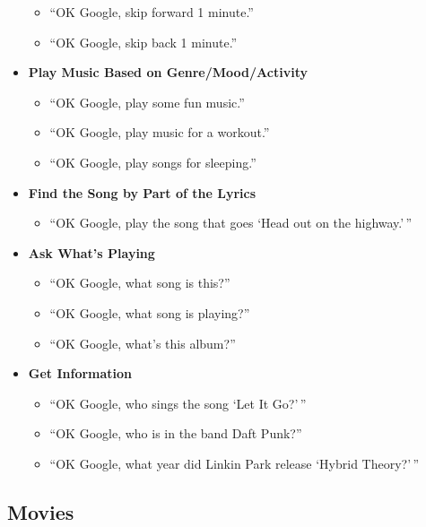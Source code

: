 \documentclass[
  jou,
  floatsintext,
  longtable,
  a4paper,
  nolmodern,
  notxfonts,
  notimes,
  colorlinks=true,linkcolor=blue,citecolor=blue,urlcolor=blue]{apa7}
\providecommand{\tightlist}{%
  \setlength{\itemsep}{0pt}\setlength{\parskip}{0pt}}
\begin{document}
\begin{itemize}
  \begin{itemize}
  \tightlist
  \item
    ``OK Google, skip forward 1 minute.''
  \item
    ``OK Google, skip back 1 minute.''
  \end{itemize}
\item
  \textbf{Play Music Based on Genre/Mood/Activity}

  \begin{itemize}
  \tightlist
  \item
    ``OK Google, play some fun music.''
  \item
    ``OK Google, play music for a workout.''
  \item
    ``OK Google, play songs for sleeping.''
  \end{itemize}
\item
  \textbf{Find the Song by Part of the Lyrics}

  \begin{itemize}
  \tightlist
  \item
    ``OK Google, play the song that goes `Head out on the highway.'\,''
  \end{itemize}
\item
  \textbf{Ask What's Playing}

  \begin{itemize}
  \tightlist
  \item
    ``OK Google, what song is this?''
  \item
    ``OK Google, what song is playing?''
  \item
    ``OK Google, what's this album?''
  \end{itemize}
\item
  \textbf{Get Information}

  \begin{itemize}
  \tightlist
  \item
    ``OK Google, who sings the song `Let It Go?'\,''
  \item
    ``OK Google, who is in the band Daft Punk?''
  \item
    ``OK Google, what year did Linkin Park release `Hybrid Theory?'\,''
  \end{itemize}
\end{itemize}

\subsection{Movies}\label{movies}
\end{document}
